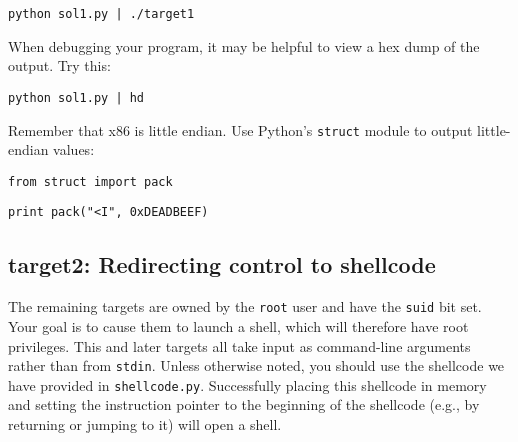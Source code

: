 \documentclass[letterpaper,12pt]{report}
\begin{document}
{\smallskip

\quad\texttt{python sol1.py | ./target1}

\medskip

When debugging your program, it may be helpful to view a hex dump of the output.  Try this:
\smallskip

\quad\texttt{python sol1.py | hd}
\medskip

Remember that x86 is little endian.  Use Python's \texttt{struct} module to output little-endian values:
\smallskip

\quad\texttt{from struct import pack}

\quad\texttt{print pack("<I", 0xDEADBEEF)}

\subsection*{target2: Redirecting control to shellcode}
\label{sec:target2}

The remaining targets are owned by the \texttt{root} user and have the \texttt{suid} bit set.  Your goal is to cause them to launch a shell, which will therefore have root privileges.  This and later targets all take input as command-line arguments rather than from \texttt{stdin}.  Unless otherwise noted, you should use the shellcode we have provided in \texttt{shellcode.py}.  Successfully placing this shellcode in memory and setting the instruction pointer to the beginning of the shellcode (e.g., by returning or jumping to it) will open a shell.

}
\end{document}
